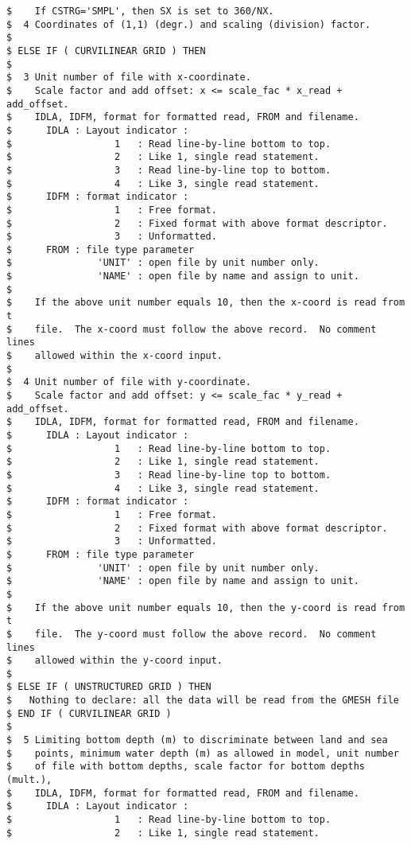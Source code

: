 \begin{footnotesize}
\begin{verbatim}
$    If CSTRG='SMPL', then SX is set to 360/NX.
$  4 Coordinates of (1,1) (degr.) and scaling (division) factor.
$
$ ELSE IF ( CURVILINEAR GRID ) THEN
$
$  3 Unit number of file with x-coordinate.
$    Scale factor and add offset: x <= scale_fac * x_read + add_offset.
$    IDLA, IDFM, format for formatted read, FROM and filename.
$      IDLA : Layout indicator :
$                  1   : Read line-by-line bottom to top.
$                  2   : Like 1, single read statement.
$                  3   : Read line-by-line top to bottom.
$                  4   : Like 3, single read statement.
$      IDFM : format indicator :
$                  1   : Free format.
$                  2   : Fixed format with above format descriptor.
$                  3   : Unformatted.
$      FROM : file type parameter
$               'UNIT' : open file by unit number only.
$               'NAME' : open file by name and assign to unit.
$
$    If the above unit number equals 10, then the x-coord is read from t
$    file.  The x-coord must follow the above record.  No comment lines 
$    allowed within the x-coord input.
$
$  4 Unit number of file with y-coordinate.
$    Scale factor and add offset: y <= scale_fac * y_read + add_offset.
$    IDLA, IDFM, format for formatted read, FROM and filename.
$      IDLA : Layout indicator :
$                  1   : Read line-by-line bottom to top.
$                  2   : Like 1, single read statement.
$                  3   : Read line-by-line top to bottom.
$                  4   : Like 3, single read statement.
$      IDFM : format indicator :
$                  1   : Free format.
$                  2   : Fixed format with above format descriptor.
$                  3   : Unformatted.
$      FROM : file type parameter
$               'UNIT' : open file by unit number only.
$               'NAME' : open file by name and assign to unit.
$
$    If the above unit number equals 10, then the y-coord is read from t
$    file.  The y-coord must follow the above record.  No comment lines 
$    allowed within the y-coord input.
$
$ ELSE IF ( UNSTRUCTURED GRID ) THEN
$   Nothing to declare: all the data will be read from the GMESH file 
$ END IF ( CURVILINEAR GRID )
$
$  5 Limiting bottom depth (m) to discriminate between land and sea
$    points, minimum water depth (m) as allowed in model, unit number
$    of file with bottom depths, scale factor for bottom depths (mult.),
$    IDLA, IDFM, format for formatted read, FROM and filename.
$      IDLA : Layout indicator :
$                  1   : Read line-by-line bottom to top.
$                  2   : Like 1, single read statement.

\end{verbatim}
\end{footnotesize}
